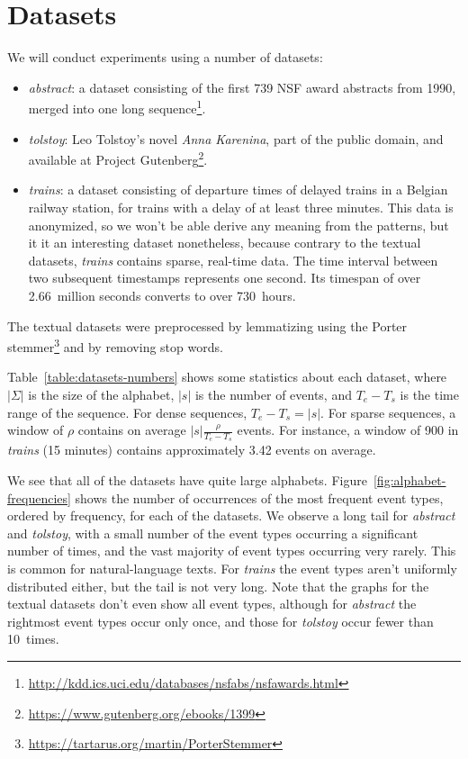 \section{Datasets}

We will conduct experiments using a number of datasets:

\begin{itemize}
\item \emph{abstract}: a dataset consisting of the first 739 NSF award abstracts from 1990, merged into one long sequence\footnote{\url{http://kdd.ics.uci.edu/databases/nsfabs/nsfawards.html}}.
\item \emph{tolstoy}: Leo Tolstoy's novel \emph{Anna Karenina}, part of the public domain, and available at Project Gutenberg\footnote{\url{https://www.gutenberg.org/ebooks/1399}}.
\item \emph{trains}: a dataset consisting of departure times of delayed trains in a Belgian railway station, for trains with a delay of at least three minutes. This data is anonymized, so we won't be able derive any meaning from the patterns, but it it an interesting dataset nonetheless, because contrary to the textual datasets, \emph{trains} contains sparse, real-time data. The time interval between two subsequent timestamps represents one second. Its timespan of over 2.66~million seconds converts to over 730~hours.
\end{itemize}

The textual datasets were preprocessed by lemmatizing using the Porter stemmer\footnote{\url{https://tartarus.org/martin/PorterStemmer}} and by removing stop words.

Table~\ref{table:datasets-numbers} shows some statistics about each dataset, where $ | \Sigma | $ is the size of the alphabet, $ | s | $ is the number of events, and $ T_e - T_s $ is the time range of the sequence. For dense sequences, $ T_e - T_s = | s | $. For sparse sequences, a window of $ \rho $ contains on average $ | s | \frac\rho{T_e - T_s} $ events. For instance, a window of 900 in \emph{trains} (15 minutes) contains approximately 3.42 events on average.

We see that all of the datasets have quite large alphabets. Figure~\ref{fig:alphabet-frequencies} shows the number of occurrences of the most frequent event types, ordered by frequency, for each of the datasets. We observe a long tail for \emph{abstract} and \emph{tolstoy}, with a small number of the event types occurring a significant number of times, and the vast majority of event types occurring very rarely. This is common for natural-language texts. For \emph{trains} the event types aren't uniformly distributed either, but the tail is not very long. Note that the graphs for the textual datasets don't even show all event types, although for \emph{abstract} the rightmost event types occur only once, and those for \emph{tolstoy} occur fewer than 10~times.

